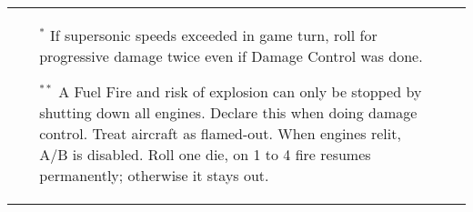 \begin{table*}
{\begin{tabular}{lcp{40em}}
{\begin{itemize}
   \item[$^*$] If supersonic speeds exceeded in game turn, roll for progressive damage twice even if Damage Control was done.
   \item[$^{**}$] A Fuel Fire and risk of explosion can only be stopped by shutting down all engines. Declare this when doing damage control. Treat aircraft as flamed-out. When engines relit, A/B is disabled. Roll one die, on 1 to 4 fire resumes permanently; otherwise it stays out.
\end{itemize}

}
\end{tabular}
}

\end{table*}